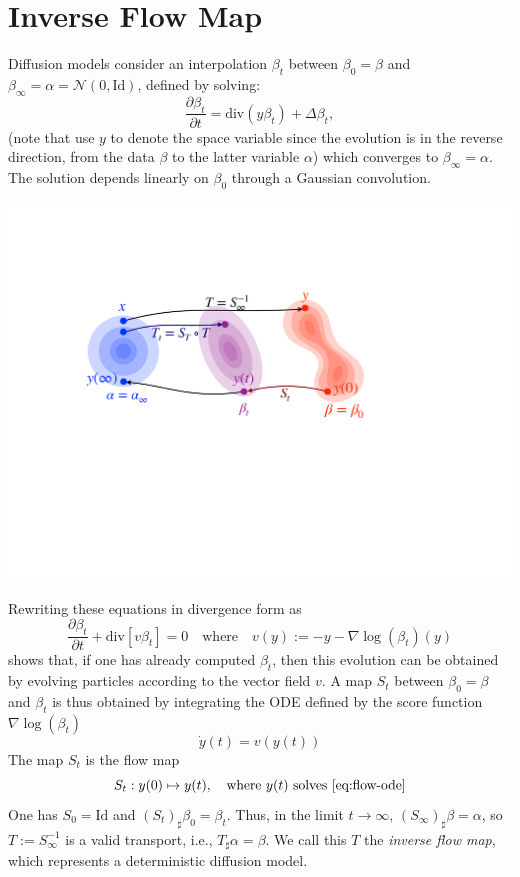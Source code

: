 \documentclass{article}
\begin{document}
\section{Inverse Flow Map}

Diffusion models consider an interpolation $\beta_t$ between $\beta_0 = \beta$ and $\beta_\infty = \alpha = \mathcal{N}(0,\text{Id})$, defined by solving:
\begin{equation}
    \frac{\partial \beta_t}{\partial t} = \text{div}(y \beta_t) + \Delta \beta_t,
\end{equation}
(note that use $y$ to denote the space variable since the evolution is in the reverse direction, from the data $\beta$ to the latter variable $\alpha$) which converges to $\beta_\infty = \alpha$. The solution depends linearly on $\beta_0$ through a Gaussian convolution.

\begin{center}
\includegraphics[width=.63\linewidth]{fig-interp.pdf}
\end{center}



Rewriting these equations in divergence form as
$$
	\frac{\partial \beta_t}{\partial t} + \text{div}[ v \beta_t ] = 0
	\quad\text{where}\quad v(y) := - y - \nabla \log(\beta_t)(y)
$$
shows that, if one has already computed $\beta_t$, then this evolution can be obtained by evolving particles according to the vector field $v$. 
%
A map $S_t$ between $\beta_0=\beta$ and $\beta_t$ is thus obtained by integrating the ODE defined by the score function $\nabla \log(\beta_t)$
\begin{equation}\label{eq:flow-ode}
    \dot{y}(t) = v(y(t)) %
\end{equation}
The map $S_t$ is the flow map
\begin{equation}
    S_t : y(0) \mapsto y(t), \quad \text{where } y(t) \text{ solves \eqref{eq:flow-ode}} 
\end{equation}
One has $S_0 = \text{Id}$ and $(S_t)_\sharp \beta_0 = \beta_t$. Thus, in the limit $t \to \infty$, $(S_\infty)_\sharp \beta = \alpha$, so $T := S_\infty^{-1}$ is a valid transport, i.e., $T_\sharp \alpha = \beta$. We call this $T$ the \emph{inverse flow map}, which represents a deterministic diffusion model.
\end{document}
